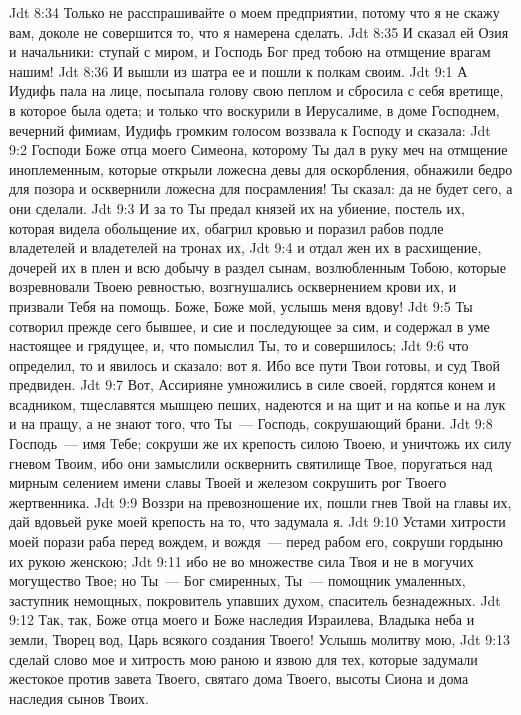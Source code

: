 \vs Jdt 8:34 Только не расспрашивайте о моем предприятии, потому что я не скажу вам, доколе не совершится то, что я намерена сделать.
\vs Jdt 8:35 И сказал ей Озия и начальники: ступай с миром, и Господь Бог пред тобою на отмщение врагам нашим!
\vs Jdt 8:36 И вышли из шатра ее и пошли к полкам своим.
\vs Jdt 9:1 А Иудифь пала на лице, посыпала голову свою пеплом и сбросила с себя вретище, в которое была одета; и только что воскурили в Иерусалиме, в доме Господнем, вечерний фимиам, Иудифь громким голосом воззвала к Господу и сказала:
\vs Jdt 9:2 Господи Боже отца моего Симеона, которому Ты дал в руку меч на отмщение иноплеменным, которые открыли ложесна девы для оскорбления, обнажили бедро для позора и осквернили ложесна для посрамления! Ты сказал: да не будет сего, а они сделали.
\vs Jdt 9:3 И за то Ты предал князей их на убиение, постель их, которая видела обольщение их, обагрил кровью и поразил рабов подле владетелей и владетелей на тронах их,
\vs Jdt 9:4 и отдал жен их в расхищение, дочерей их в плен и всю добычу в раздел сынам, возлюбленным Тобою, которые возревновали Твоею ревностью, возгнушались осквернением крови их, и призвали Тебя на помощь. Боже, Боже мой, услышь меня вдову!
\vs Jdt 9:5 Ты сотворил прежде сего бывшее, и сие и последующее за сим, и содержал в уме настоящее и грядущее, и, что помыслил Ты, то и совершилось;
\vs Jdt 9:6 что определил, то и явилось и сказало: вот я. Ибо все пути Твои готовы, и суд Твой  предвиден.
\vs Jdt 9:7 Вот, Ассирияне умножились в силе своей, гордятся конем и всадником, тщеславятся мышцею пеших, надеются и на щит и на копье и на лук и на пращу, а не знают того, что Ты~--- Господь, сокрушающий брани.
\vs Jdt 9:8 Господь~--- имя Тебе; сокруши же их крепость силою Твоею, и уничтожь их силу гневом Твоим, ибо они замыслили осквернить святилище Твое, поругаться над мирным селением имени славы Твоей и железом сокрушить рог Твоего жертвенника.
\vs Jdt 9:9 Воззри на превозношение их, пошли гнев Твой на главы их, дай вдовьей руке моей крепость на то, что задумала я.
\vs Jdt 9:10 Устами хитрости моей порази раба перед вождем, и вождя~--- перед рабом его,  сокруши гордыню их рукою женскою;
\vs Jdt 9:11 ибо не во множестве сила Твоя и не в могучих могущество Твое; но Ты~--- Бог смиренных, Ты~--- помощник умаленных, заступник немощных, покровитель упавших духом, спаситель безнадежных.
\vs Jdt 9:12 Так, так, Боже отца моего и Боже наследия Израилева, Владыка неба и земли, Творец вод, Царь всякого создания Твоего! Услышь молитву мою,
\vs Jdt 9:13 сделай слово мое и хитрость мою раною и язвою для тех, которые задумали жестокое против завета Твоего, святаго дома Твоего, высоты Сиона и дома наследия сынов Твоих.
